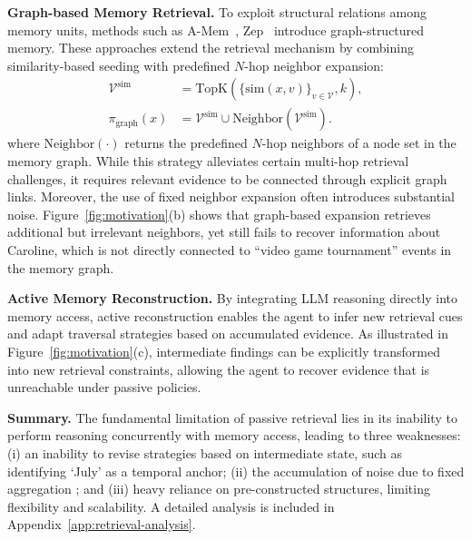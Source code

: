 \documentclass{llmxive}
\begin{document}
\textbf{Graph-based Memory Retrieval.}
To exploit structural relations among memory units, methods such as A-Mem~\cite{DBLP:journals/corr/abs-2502-12110}, Zep~\cite{DBLP:journals/corr/abs-2501-13956} introduce graph-structured memory.
These approaches extend the retrieval mechanism by combining similarity-based seeding with predefined $N$-hop neighbor expansion:
\begin{equation}
\begin{aligned}
\mathcal{V}^{\text{sim}}
&=
\mathrm{TopK}\!\left(\{ \mathrm{sim}(x,v) \}_{v \in \mathcal{V}}, k \right), \\
\pi_{\text{graph}}(x)
&=
\mathcal{V}^{\text{sim}} \cup \mathrm{Neighbor}\!\left(\mathcal{V}^{\text{sim}}\right).
\end{aligned}
\end{equation}
where $\mathrm{Neighbor}(\cdot)$ returns the predefined $N$-hop neighbors of a node set in the memory graph.
While this strategy alleviates certain multi-hop retrieval challenges, it requires relevant evidence to be connected through explicit graph links.
Moreover, the use of fixed neighbor expansion often introduces substantial noise.
Figure~\ref{fig:motivation}(b) shows that graph-based expansion retrieves additional but irrelevant neighbors, yet still fails to recover information about Caroline, which is not directly connected to ``video game tournament'' events in the memory graph.

\textbf{Active Memory Reconstruction.}
By integrating LLM reasoning directly into memory access, active reconstruction enables the agent to infer new retrieval cues and adapt traversal strategies based on accumulated evidence.
As illustrated in Figure~\ref{fig:motivation}(c), intermediate findings can be explicitly transformed into new retrieval constraints, allowing the agent to recover evidence that is unreachable under passive policies.


\textbf{Summary.}
The fundamental limitation of passive retrieval lies in its inability to perform reasoning concurrently with memory access, leading to three  weaknesses: (i) an inability to revise strategies based on intermediate state, such as identifying `July' as a temporal anchor; (ii) the accumulation of noise due to fixed aggregation ; and (iii) heavy reliance on pre-constructed structures, limiting flexibility and scalability. A detailed analysis is included  in Appendix~\ref{app:retrieval-analysis}.
\end{document}
